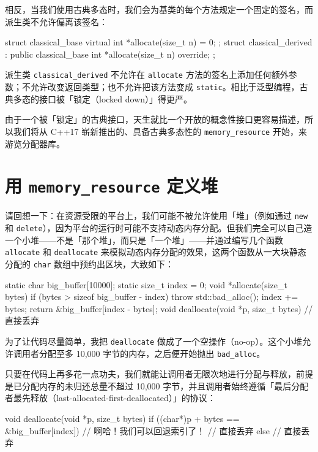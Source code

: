 相反，当我们使用古典多态时，我们会为基类的每个方法规定一个固定的签名，而派生类不允许偏离该签名：

\begin{codebox}[cpp]
    struct classical_base {
      virtual int *allocate(size_t n) = 0;
    };
    struct classical_derived : public classical_base {
      int *allocate(size_t n) override;
    };
\end{codebox}

派生类 \texttt{classical\_\allowbreak{}derived} 不允许在 \texttt{allocate} 方法的签名上添加任何额外参数；不允许改变返回类型；也不允许把该方法变成 \texttt{static}。相比于泛型编程，古典多态的接口被「锁定（locked down）」得更严。

由于一个被「锁定」的古典接口，天生就比一个开放的概念性接口更容易描述，所以我们将从 C++17 崭新推出的、具备古典多态性的 \texttt{memory\_\allowbreak{}resource} 开始，来游览分配器库。

\section{用 \texttt{memory\_\allowbreak{}resource} 定义堆}

请回想一下：在资源受限的平台上，我们可能不被允许使用「堆」（例如通过 \texttt{new} 和 \texttt{delete}），因为平台的运行时可能不支持动态内存分配。但我们完全可以自己造一个小堆——不是「那个堆」，而只是「一个堆」——并通过编写几个函数 \texttt{allocate} 和 \texttt{deallocate} 来模拟动态内存分配的效果，这两个函数从一大块静态分配的 \texttt{char} 数组中预约出区块，大致如下：

\begin{codebox}[cpp]
    static char big_buffer[10000];
    static size_t index = 0;
    void *allocate(size_t bytes) {
      if (bytes > sizeof big_buffer - index) {
        throw std::bad_alloc();
      }
      index += bytes;
      return &big_buffer[index - bytes];
    }
    void deallocate(void *p, size_t bytes) {
      // 直接丢弃
    }
\end{codebox}

为了让代码尽量简单，我把 \texttt{deallocate} 做成了一个空操作（no-op）。这个小堆允许调用者分配至多 10,000 字节的内存，之后便开始抛出 \texttt{bad\_\allowbreak{}alloc}。

只要在代码上再多花一点功夫，我们就能让调用者无限次地进行分配与释放，前提是已分配内存的未归还总量不超过 10,000 字节，并且调用者始终遵循「最后分配者最先释放（last-allocated-first-deallocated）」的协议：

\begin{codebox}[cpp]
    void deallocate(void *p, size_t bytes) {
      if ((char*)p + bytes == &big_buffer[index]) {
        // 啊哈！我们可以回退索引了！
        // 直接丢弃
      } else {
        // 直接丢弃
      }
    }
\end{codebox}

